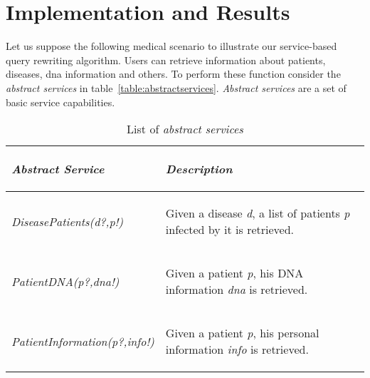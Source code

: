 \section{Implementation and Results}
Let us suppose the following medical scenario to illustrate our service-based query rewriting algorithm. Users can retrieve information about patients, diseases, dna information and others.
To perform these function consider the \textit{abstract services} in table~\ref{table:abstractservices}. 
\textit{Abstract services} are a set of basic service capabilities. 

\begin{table}[h!]
\center
\begin{tabular}{|p{3.7cm}|p{4cm}|}
\hline
\begin{small} \textbf{\textit{Abstract Service}} \end{small} & \begin{small}\textbf{\textit{Description}} \end{small}\\ 
\hline 
\begin{small} \textit{DiseasePatients(d?,p!)} \end{small} & \begin{small} Given a disease \textit{d}, a list of patients \textit{p} infected by it is retrieved. \end{small}\\ 
\hline 
\begin{small} \textit{PatientDNA(p?,dna!)} \end{small} & \begin{small} Given a patient \textit{p}, his DNA information \textit{dna} is retrieved. \end{small}\\ 
\hline 
\begin{small} \textit{PatientInformation(p?,info!)} \end{small} & \begin{small} Given a patient \textit{p}, his personal information \textit{info} is retrieved. \end{small}\\ 
\hline 
\end{tabular} \caption{List of \textit{abstract services}}
\end{table}\label{table:abstractservices}

